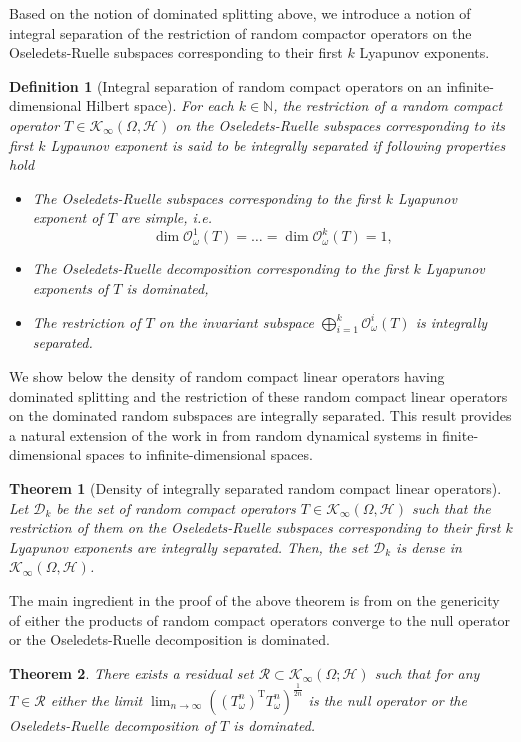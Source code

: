 \documentclass[pdflatex,sn-mathphys-num]{sn-jnl}%
\theoremstyle{thmstyleone}%
\newtheorem{theorem}{Theorem}%
\theoremstyle{thmstyletwo}%
\theoremstyle{thmstylethree}%
\newtheorem{definition}{Definition}%
\newcommand{\N}{\mathbb{N}}
\newcommand{\cH}{\mathcal{H}}
\newcommand{\cK}{\mathcal{K}}
\newcommand{\cO}{\mathcal{O}}
\newcommand{\rT}{\mathrm {T}}
\numberwithin{equation}{section}
\begin{document}
%
%
%
Based on the notion of dominated splitting above, we introduce a notion of integral separation of the restriction of random compactor operators on the Oseledets-Ruelle subspaces corresponding to their first $k$ Lyapunov exponents.
%
\begin{definition}[Integral  separation of random compact operators on an infinite-dimensional Hilbert space]\label{IntegralSeparation_Hilbertspace}
For each $k\in \N$, the restriction of a random compact operator $T\in\cK_{\infty}(\Omega,\cH)$ on the Oseledets-Ruelle subspaces corresponding to its first $k$ Lypaunov exponent  is said to be integrally separated if following properties hold
\begin{itemize}
\item [(i1)] The Oseledets-Ruelle subspaces corresponding to the first $k$ Lyapunov exponent of $T$ are simple, i.e.
\[
\dim \mathcal O^1_{\omega}(T)=\dots=\dim \mathcal O^k_{\omega}(T)=1,
\]
\item [(i2)] The Oseledets-Ruelle decomposition corresponding to the first $k$ Lyapunov exponents of $T$ is dominated,
\item [(i3)] The restriction of $T$ on the invariant subspace $\bigoplus_{i=1}^k \cO^i_{\omega}(T)$ is integrally separated. 
\end{itemize}
\end{definition}
%
%
We show below the density of random compact linear operators having dominated splitting and the restriction of these random compact linear operators on the dominated random subspaces are integrally separated.  This result provides a natural extension of the work in \cite{Cong05} from random dynamical systems in finite-dimensional spaces to infinite-dimensional spaces. 
%
%
\begin{theorem}[Density of integrally separated random compact linear operators]\label{DensityIntegralSeparation_Hilbertspace}
Let $\mathcal D_k$ be the set of random compact operators $T\in\cK_{\infty}(\Omega,\cH)$ such that the restriction of them on the Oseledets-Ruelle subspaces corresponding to their first $k$ Lyapunov exponents are integrally separated. Then, the set $\mathcal D_k$ is dense in $\cK_{\infty}(\Omega,\cH)$. 
\end{theorem}
%
The main ingredient in the proof of the above theorem is from \cite{Bessa2008} on the genericity of either the products of random compact operators converge to the null operator or the Oseledets-Ruelle decomposition is dominated. 
%
\begin{theorem}\label{Genericity_Dichotomy} There exists a residual set $\mathcal R\subset \cK_{\infty}(\Omega;\mathcal H)$ such that for any $T\in\mathcal R$ either the limit $\lim_{n\to\infty}\left(\left(T_{\omega}^n\right)^{\rT} T_{\omega}^n\right)^{\frac{1}{2n}}$ is the null operator or the Oseledets-Ruelle decomposition of $T$ is dominated.
\end{theorem}
\end{document}
